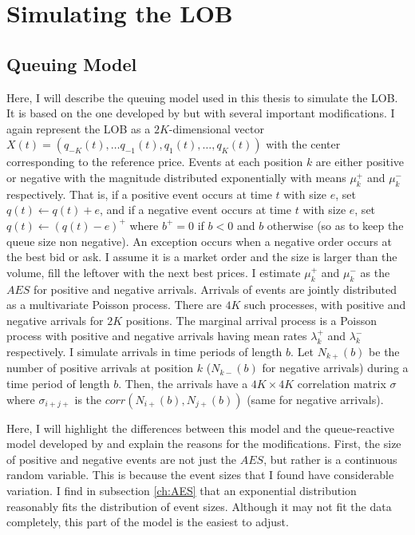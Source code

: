 \section{Simulating the LOB}


\subsection{Queuing Model}\label{ch:queue_model}
Here, I will describe the queuing model used in this thesis to simulate the LOB. It is based on the one developed by \cite{A6} but with several important modifications. I again represent the LOB as a $2K$-dimensional vector $X(t) = (q_{-K}(t), … q_{-1}(t), q_1(t), … , q_K(t))$ with the center corresponding to the reference price. Events at each position $k$ are either positive or negative with the magnitude distributed exponentially with means $\mu^+_k$ and $\mu^-_k$ respectively. That is, if a positive event occurs at time $t$ with size $e$, set $q(t) \leftarrow q(t) + e$, and if a negative event occurs at time $t$ with size $e$, set $q(t) \leftarrow (q(t) - e)^+$ where $b^+ = 0$ if $b < 0$ and $b$ otherwise (so as to keep the queue size non negative). An exception occurs when a negative order occurs at the best bid or ask. I assume it is a market order and the size is larger than the volume, fill the leftover with the next best prices. I estimate $\mu^+_k$ and $\mu^-_k$ as the $AES$ for positive and negative arrivals. Arrivals of events are jointly distributed as a multivariate Poisson process. There are $4K$ such processes, with positive and negative arrivals for $2K$ positions. The marginal arrival process is a Poisson process with positive and negative arrivals having mean rates $\lambda^+_k$ and $\lambda^-_k$ respectively. I simulate arrivals in time periods of length $b$. Let $N_{k+}(b)$ be the number of positive arrivals at position $k$ ($N_{k-}(b)$ for negative arrivals) during a time period of length $b$. Then, the arrivals have a $4K\times4K$ correlation matrix $\sigma$ where $\sigma_{i+j+}$ is the $corr(N_{i+}(b), N_{j+}(b))$ (same for negative arrivals).

Here, I will highlight the differences between this model and the queue-reactive model developed by \cite{A6} and explain the reasons for the modifications. First, the size of positive and negative events are not just the $AES$, but rather is a continuous random variable. This is because the event sizes that I found have considerable variation. I find in subsection \ref{ch:AES} that an exponential distribution reasonably fits the distribution of event sizes. Although it may not fit the data completely, this part of the model is the easiest to adjust.

